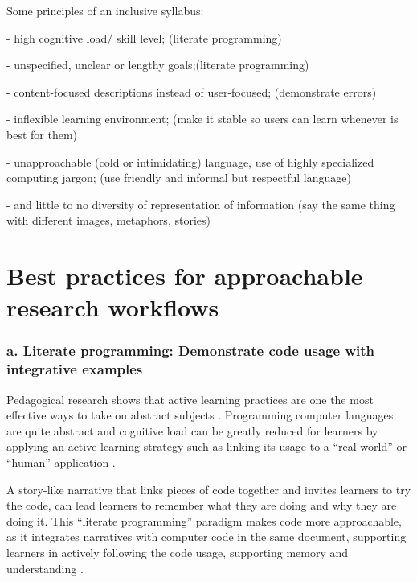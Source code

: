 \documentclass[12pt]{article}
\begin{document}


Some principles of an inclusive syllabus:

- high cognitive load/ skill level; (literate programming)

- unspecified, unclear or lengthy goals;(literate programming)

- content-focused descriptions instead of user-focused; (demonstrate errors)

- inflexible learning environment; (make it stable so users can learn whenever is best for them)

- unapproachable (cold or intimidating) language, use of highly specialized computing jargon; (use friendly and informal but respectful language)

- and little to no diversity of representation of information (say the same thing with different images, metaphors, stories)


\section*{Best practices for approachable research workflows}
\label{sec:addressing}

\subsubsection*{a. Literate programming: Demonstrate code usage with integrative examples}


Pedagogical research shows that active learning practices are one the most effective
ways to take on abstract subjects \citep{freeman2014active}.
Programming computer languages are quite abstract and cognitive load can be greatly
reduced for learners by applying an active learning strategy such as linking its usage to
a ``real world'' or ``human'' application \citep{felder2009active}.

A story-like narrative that links pieces of code together and invites learners
to try the code, can lead learners to remember what they are doing and
why they are doing it.
This ``literate programming'' paradigm \citep{knuth1984literate, fritzson2002mathmodelica}
makes code more approachable, as it integrates narratives with computer code in
the same document, supporting learners in actively following
the code usage, supporting memory and understanding \citep{piccolo2016tools}.
\end{document}
